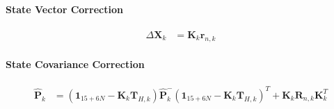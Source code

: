 \documentclass[10pt,letterpaper,fleqn,oneside]{article}
\def\Vec#1{\mathbf{#1}} %
\begin{document}
\paragraph{State Vector Correction}
\begin{align}
\Delta\Vec{X}_k &= \Vec{K}_k\Vec{r}_{n,k}
\end{align}

\paragraph{State Covariance Correction}
\begin{align}
\hat{\Vec{P}}_k &= \left(\Vec{1}_{15+6N} - \Vec{K}_k\Vec{T}_{H,k} \right)\hat{\Vec{P}}^-_k\left(\Vec{1}_{15+6N} - \Vec{K}_k\Vec{T}_{H,k} \right)^T + \Vec{K}_k\Vec{R}_{n,k}\Vec{K}_k^T
\end{align}


%
%

\end{document}

